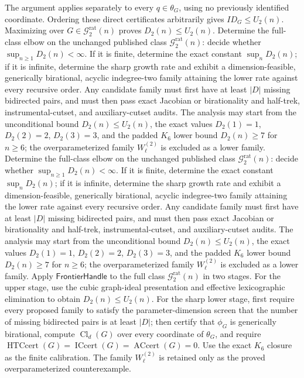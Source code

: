 The argument applies separately to every \(q\in\theta_G\), using no previously identified coordinate.  Ordering these direct certificates arbitrarily gives \(ID_G\leq U_2(n)\).  Maximizing over \(G\in\mathcal G_{2}^{\mathrm{rat}}(n)\) proves \(D_2(n)\leq U_2(n)\).
Determine the full-class elbow on the unchanged published class \(\mathcal G_{2}^{\mathrm{rat}}(n)\): decide whether \(\sup_{n\geq1}D_2(n)<\infty\).  If it is finite, determine the exact constant \(\sup_nD_2(n)\); if it is infinite, determine the sharp growth rate and exhibit a dimension-feasible, generically birational, acyclic indegree-two family attaining the lower rate against every recursive order.  Any candidate family must first have at least \(|D|\) missing bidirected pairs, and must then pass exact Jacobian or birationality and half-trek, instrumental-cutset, and auxiliary-cutset audits.  The analysis may start from the unconditional bound \(D_2(n)\leq U_2(n)\), the exact values \(D_2(1)=1\), \(D_2(2)=2\), \(D_2(3)=3\), and the padded \(K_6\) lower bound \(D_2(n)\geq7\) for \(n\geq6\); the overparameterized family \(W_{\ell}^{(2)}\) is excluded as a lower family.
Determine the full-class elbow on the unchanged published class \(\mathcal G_{2}^{\mathrm{rat}}(n)\): decide whether \(\sup_{n\geq1}D_2(n)<\infty\).  If it is finite, determine the exact constant \(\sup_nD_2(n)\); if it is infinite, determine the sharp growth rate and exhibit a dimension-feasible, generically birational, acyclic indegree-two family attaining the lower rate against every recursive order.  Any candidate family must first have at least \(|D|\) missing bidirected pairs, and must then pass exact Jacobian or birationality and half-trek, instrumental-cutset, and auxiliary-cutset audits.  The analysis may start from the unconditional bound \(D_2(n)\leq U_2(n)\), the exact values \(D_2(1)=1\), \(D_2(2)=2\), \(D_2(3)=3\), and the padded \(K_6\) lower bound \(D_2(n)\geq7\) for \(n\geq6\); the overparameterized family \(W_{\ell}^{(2)}\) is excluded as a lower family.
Apply \(\mathsf{FrontierHandle}\) to the full class \(\mathcal G_{2}^{\mathrm{rat}}(n)\) in two stages.  For the upper stage, use the cubic graph-ideal presentation and effective lexicographic elimination to obtain \(D_2(n)\leq U_2(n)\).  For the sharp lower stage, first require every proposed family to satisfy the parameter-dimension screen that the number of missing bidirected pairs is at least \(|D|\); then certify that \(\phi_G\) is generically birational, compute \(\operatorname{Cl}_d(G)\) over every coordinate of \(\theta_G\), and require \(\operatorname{HTCcert}(G)=\operatorname{ICcert}(G)=\operatorname{ACcert}(G)=0\).  Use the exact \(K_6\) closure as the finite calibration.  The family \(W_{\ell}^{(2)}\) is retained only as the proved overparameterized counterexample.
